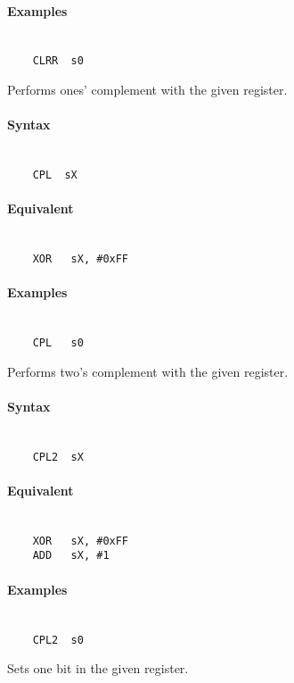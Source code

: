     \paragraph{Examples}
        ~\\
        \verb'    CLRR  s0'

\clearpage
{}
    Performs ones' complement with the given register.

    \paragraph{Syntax}
        ~\\
        \verb'    CPL  sX'

    \paragraph{Equivalent}
        ~\\
        \verb'    XOR   sX, #0xFF'

    \paragraph{Examples}
        ~\\
        \verb'    CPL   s0'

    Performs two's complement with the given register.

    \paragraph{Syntax}
        ~\\
        \verb'    CPL2  sX'

    \paragraph{Equivalent}
        ~\\
        \verb'    XOR   sX, #0xFF'\\
        \verb'    ADD   sX, #1'

    \paragraph{Examples}
        ~\\
        \verb'    CPL2  s0'

    Sets one bit in the given register.

